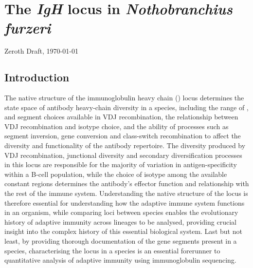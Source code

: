 
\chapter{The \textit{IgH} locus in \textit{Nothobranchius furzeri}}  
\onehalfspacing

{\LARGE Zeroth Draft, \today}

\renewcommand{\floatpagefraction}{.85}%
\renewcommand{\topfraction}{.85}%

%
%
\pagebreak


\section{Introduction} %

The native structure of the immunoglobulin heavy chain (\igh{}) locus determines the state space of antibody heavy-chain diversity in a species, including the range of \vh, \dh and \jh segment choices available in VDJ recombination, the relationship between VDJ recombination and isotype choice, and the ability of processes such as segment inversion, gene conversion and class-switch recombination to affect the diversity and functionality of the antibody repertoire. The diversity produced by VDJ recombination, junctional diversity and secondary diversification processes in this locus are responsible for the majority of variation in antigen-specificity within a B-cell population, while the choice of isotype among the available \igh{} constant regions determines the antibody's effector function and relationship with the rest of the immune system. Understanding the native structure of the \igh{} locus is therefore essential for understanding how the adaptive immune system functions in an organism, while comparing loci between species enables the evolutionary history of adaptive immunity across lineages to be analysed, providing crucial insight into the complex history of this essential biological system. Last but not least, by providing thorough documentation of the \igh{} gene segments present in a species, characterising the \igh{} locus in a species is an essential forerunner to quantitative analysis of adaptive immunity using immunoglobulin sequencing. %

